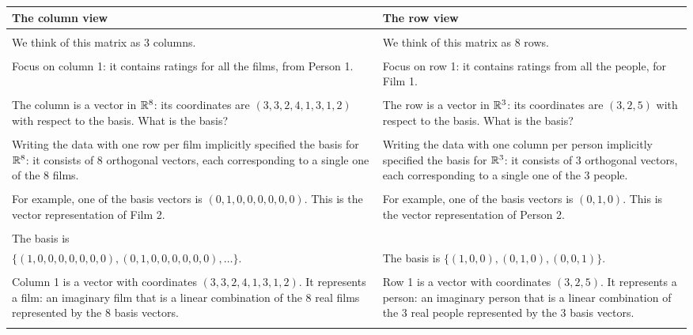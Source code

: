 \begin{tabular}{|p{8cm}|p{8 cm}|}
  {\bf The column view}
  &{\bf The row view}\\

  \hline
  &\\
  We think of this matrix as 3 columns.
  &We think of this matrix as 8 rows.\\
  &\\

  Focus on column 1: it contains ratings for all the films, from Person 1.
  &Focus on row 1: it contains ratings from all the people, for Film 1.\\
  &\\

  The column is a vector in $\mathbb{R}^8$: its coordinates are $(3,3,2,4,1,3,1,2)$ with respect to the basis. What is the
  basis?
  &The row is a vector in $\mathbb{R}^3$: its coordinates are $(3, 2, 5)$ with respect to the basis. What is the
    basis?\\
  &\\

  Writing the data with one row per film implicitly specified the basis for $\mathbb{R}^8$:
  it consists of 8 orthogonal vectors, each corresponding to a single one of the 8 films.
  &Writing the data with one column per person implicitly specified the basis for $\mathbb{R}^3$:
    it consists of 3 orthogonal vectors, each corresponding to a single one of the 3 people.\\
  &\\

  For example, one of the basis vectors is $(0, 1, 0, 0, 0, 0, 0, 0)$. This is the
  vector representation of Film 2.
  &For example, one of the basis vectors is $(0, 1, 0)$. This is the vector
    representation of Person 2.\\
  &\\

  The basis is\\ $\{(1, 0, 0, 0, 0, 0, 0, 0), (0, 1, 0, 0, 0, 0, 0, 0), \ldots\}$.
  &The basis is $\{(1, 0, 0), (0, 1, 0), (0, 0, 1)\}$.\\
  &\\

  Column 1 is a vector with coordinates $(3,3,2,4,1,3,1,2)$.
  It represents a film: an imaginary film that is a linear combination of the 8 real
  films represented by the 8 basis vectors.
  &Row 1 is a vector with coordinates $(3, 2, 5)$.
    It represents a person: an imaginary person that is a linear combination of the 3 real
    people represented by the 3 basis vectors.\\
  &\\


\end{tabular}
